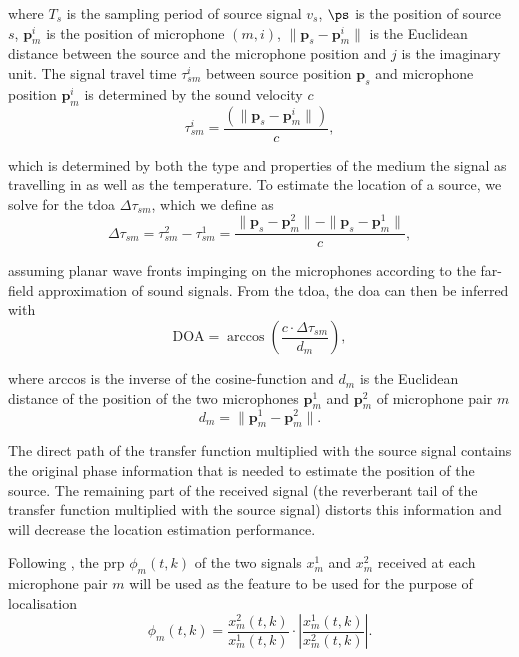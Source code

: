 where $T_s$ is the sampling period of source signal $v_s$, $\ps$ is the position of source $s$, $\bm p^i_m$ is the position of microphone $(m,i)$, $\|\bm p_s-\bm p_m^i\|$ is the Euclidean distance between the source and the microphone position and $j$ is the imaginary unit. The signal travel time $\tau^i_{sm}$ between source position $\bm p_s$ and microphone position $\bm p^i_m$ is determined by the sound velocity $c$
\begin{equation}
	\tau^i_{sm}=\frac{\left(\|\bm p_s-\bm p_m^i\|\right)}{c},
\end{equation}

which is determined by both the type and properties of the medium the signal as travelling in as well as the temperature. To estimate the location of a source, we solve for the \gls{tdoa} $\Delta\tau_{sm}$, which we define as
\begin{equation}
    \Delta\tau_{sm}=\tau^2_{sm}-\tau^1_{sm}=\frac{\|\bm p_s-\bm p_m^2\|-\|\bm p_s-\bm p_m^1\|}{c},
\end{equation}

assuming planar wave fronts impinging on the microphones according to the far-field approximation of sound signals. From the \gls{tdoa}, the \gls{doa} can then be inferred with
\begin{equation}
    \text{DOA}=\arccos\left (\frac{c\cdot \Delta\tau_{sm}}{d_m}\right ),
\end{equation}

where arccos is the inverse of the cosine-function and $d_m$ is the Euclidean distance of the position of the two microphones $\bm p_m^1$ and $\bm p_m^2$ of microphone pair $m$
\begin{equation}
    d_m=\| \bm p_m^1-\bm p_m^2\|.
\end{equation}

The direct path of the transfer function multiplied with the source signal contains the original phase information that is needed to estimate the position of the source. The remaining part of the received signal (the reverberant tail of the transfer function multiplied with the source signal) distorts this information and will decrease the location estimation performance. 

Following \cite{Schwartz2014}, the \gls{prp} $\phi_{m}(t,k)$ of the two signals $x_{m}^1$ and $x_{m}^2$ received at each microphone pair $m$ will be used as the feature to be used for the purpose of localisation
\begin{equation}
    \phi_{m}(t,k)=\frac{x^2_{m}(t,k)}{x^1_{m}(t,k)}\cdot \left |\frac{x^1_{m}(t,k)}{x^2_{m}(t,k)}\right |.
\label{eq:prp}
\end{equation}

